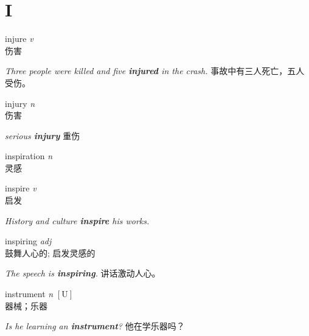 \section{I}

\item[] {
    \lettrine{injure}{}  
    \textit{v} 
    \\
    伤害

    \textit{Three people were killed and five \textbf{injured} in the crash.}
    事故中有三人死亡，五人受伤。

} 

\item[] {
    \lettrine{injury}{}  
    \textit{n} 
    \\
    伤害

    \textit{serious \textbf{injury}}
    重伤

} 

\item[] {
    \lettrine{inspiration}{}  
    \textit{n} 
    \\
    灵感

} 

\item[] {
    \lettrine{inspire}{}  
    \textit{v} 
    \\
    启发

    \textit{History and culture \textbf{inspire} his works. }

} 

\item[] {
    \lettrine{inspiring}{}  
    \textit{adj} 
    \\
    鼓舞人心的; 启发灵感的

    \textit{The speech is \textbf{inspiring}. }
    讲话激动人心。

} 

\item[] {
    \lettrine{instrument}{}  
    \textit{n} 
    $\mathrm{[U]}$ 
    \\
    器械；乐器

    \textit{Is he learning an \textbf{instrument}?}
    他在学乐器吗？

} 
